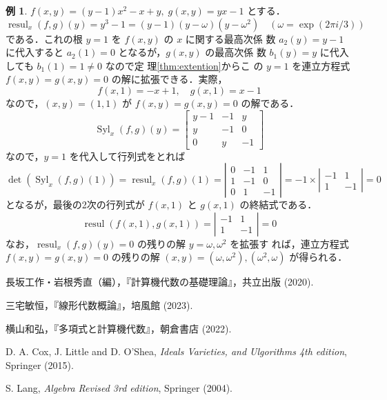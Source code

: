 \documentclass[12pt, uplatex, dvipdfmx]{jsarticle}
\theoremstyle{definition}
\newtheorem{example}{例}
\DeclareMathOperator{\Syl}{Syl}
\DeclareMathOperator{\resul}{resul}
\begin{document}
\begin{example}
  $f(x,y) = (y-1)x^2 - x +y, \; g(x,y)=yx-1$ とする．
  \[
    \resul_x(f,g)(y) = y^3-1 = (y-1)(y-\omega)(y-\omega^2) \quad \left( \omega = \exp\left(2\pi i/3\right) \right)
  \]
  である．これの根 $y=1$ を $f(x,y)$ の $x$ に関する最高次係
  数 $a_2(y)=y-1$ に代入すると $a_2(1)=0$ となるが，$g(x,y)$ の最高次係
  数 $b_1(y)=y$ に代入しても $b_1(1)=1\neq 0$ なので定
  理\ref{thm:extention}からこ
  の $y=1$ を連立方程式 $f(x,y)=g(x,y)=0$ の解に拡張できる．実際，
  \[
    f(x,1) = -x+1, \quad g(x,1)=x-1
  \]
  なので，$(x,y)=(1,1)$ が $f(x,y)=g(x,y)=0$ の解である．
  \[
    \Syl_x(f,g)(y) = \left[
      \begin{array}{ccc}
        y-1 & -1 & y\\
        y & -1 & 0\\
        0 & y & -1
      \end{array}
    \right]
  \]
  なので，$y=1$ を代入して行列式をとれば
  \[
    \det\left( \Syl_x(f,g)(1)\right) = \resul_x(f,g)(1)= \left|
      \begin{array}{rrr}
        0 & -1 & 1\\
        1 & -1 & 0\\
        0 & 1 & -1
      \end{array}
    \right| = -1 \times \left|
      \begin{array}{rr}
        -1 & 1\\
        1 & -1
      \end{array}
    \right|=0
  \]
  となるが，最後の2次の行列式が $f(x,1)$ と $g(x,1)$ の終結式である．
  \[
    \resul(f(x,1), g(x,1)) = \left|
      \begin{array}{rr}
        -1 & 1\\
        1 & -1
      \end{array}
    \right|=0
  \]
  なお，$\resul_x(f,g)(y)=0$ の残りの解 $y= \omega , \omega^2$ を拡張す
  れば，連立方程式 $f(x,y)=g(x,y)=0$ の残りの解
  $(x,y) = \left( \omega, \omega^2\right), \left( \omega^2,
    \omega\right)$ が得られる．
\end{example}

\begin{thebibliography}{99}
 長坂工作・岩根秀直（編），『計算機代数の基礎理論』，共立出版 (2020).

 三宅敏恒，『線形代数概論』，培風館 (2023).

 横山和弘，『多項式と計算機代数』，朝倉書店 (2022).

 D. A. Cox, J. Little and D. O'Shea, \textit{Ideals Varieties, and Ulgorithms 4th edition}, Springer (2015).

 S. Lang, \textit{Algebra Revised 3rd edition}, Springer (2004). 
\end{thebibliography}
\end{document}

